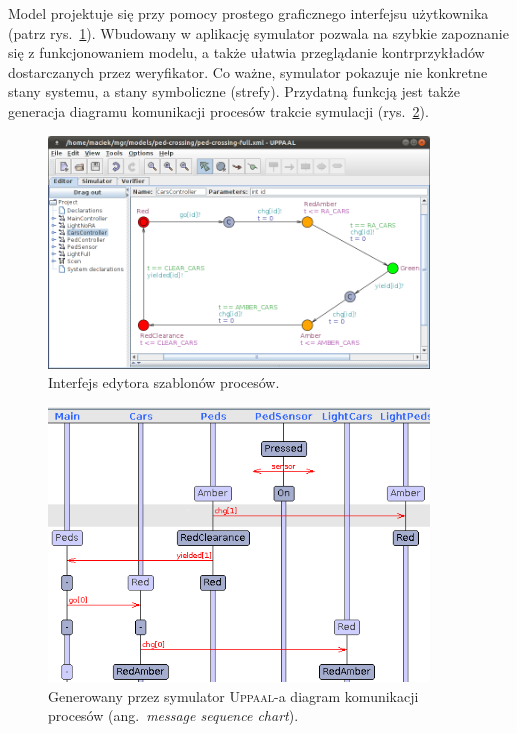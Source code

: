 \documentclass{pracamgr}
\newcommand{\ang}[1]{(ang.~\emph{#1})}
\newcommand{\upp}{\textsc{Uppaal}}
\theoremstyle{plain}
\begin{document}
Model projektuje się przy pomocy prostego graficznego interfejsu
użytkownika (patrz rys.~\ref{img:uppaal-gui}). Wbudowany w aplikację
symulator pozwala na szybkie zapoznanie się z funkcjonowaniem modelu,
a także ułatwia przeglądanie kontrprzykładów dostarczanych przez
weryfikator. Co ważne, symulator pokazuje nie konkretne stany systemu,
a stany symboliczne (strefy). Przydatną funkcją jest także generacja
diagramu komunikacji procesów trakcie symulacji
(rys.~\ref{img:uppaal-msc}).
\begin{figure}
  \centering
  \includegraphics[width=0.9\textwidth]{img/uppaal-editor.png}
  \caption{Interfejs edytora szablonów procesów.}
  \label{img:uppaal-gui}
\end{figure}

\begin{figure}
  \centering
  \includegraphics[width=0.9\textwidth]{img/uppaal-msc.png}
  \caption{Generowany przez symulator \upp-a diagram komunikacji
    procesów \ang{message sequence chart}.}
  \label{img:uppaal-msc}
\end{figure}
\end{document}
